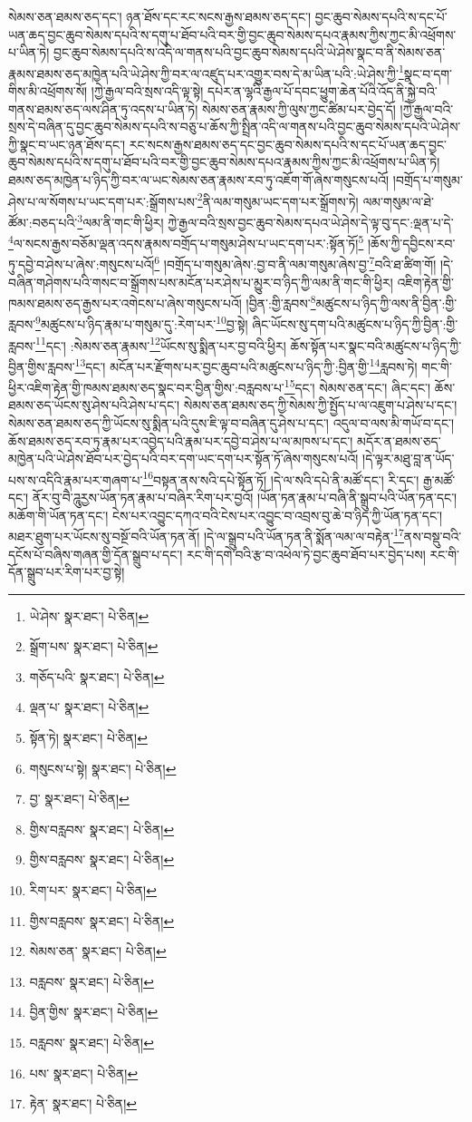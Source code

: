 སེམས་ཅན་ཐམས་ཅད་དང་། ཉན་ཐོས་དང་རང་སངས་རྒྱས་ཐམས་ཅད་དང་། བྱང་ཆུབ་སེམས་དཔའི་ས་དང་པོ་ཡན་ཆད་བྱང་ཆུབ་སེམས་དཔའི་ས་དགུ་པ་ཐོབ་པའི་བར་གྱི་བྱང་ཆུབ་སེམས་དཔའ་རྣམས་ཀྱིས་ཀྱང་མི་འཕྲོགས་པ་ཡིན་ཏེ། བྱང་ཆུབ་སེམས་དཔའི་ས་འདི་ལ་གནས་པའི་བྱང་ཆུབ་སེམས་དཔའི་ཡེ་ཤེས་སྣང་བ་ནི་སེམས་ཅན་རྣམས་ཐམས་ཅད་མཁྱེན་པའི་ཡེ་ཤེས་ཀྱི་བར་ལ་འཛུད་པར་འགྱུར་བས་དེ་མ་ཡིན་པའི་:ཡེ་ཤེས་ཀྱི་\footnote{ཡེ་ཤེས་  སྣར་ཐང་།  པེ་ཅིན། }སྣང་བ་དག་གིས་མི་འཕྲོགས་སོ། །ཀྱེ་རྒྱལ་བའི་སྲས་འདི་ལྟ་སྟེ། དཔེར་ན་ལྷའི་རྒྱལ་པོ་དབང་ཕྱུག་ཆེན་པོའི་འོད་ནི་སྐྱེ་བའི་གནས་ཐམས་ཅད་ལས་ཤིན་ཏུ་འདས་པ་ཡིན་ཏེ། སེམས་ཅན་རྣམས་ཀྱི་ལུས་ཀྱང་ཚིམ་པར་བྱེད་དོ། །ཀྱེ་རྒྱལ་བའི་སྲས་དེ་བཞིན་དུ་བྱང་ཆུབ་སེམས་དཔའི་ས་བཅུ་པ་ཆོས་ཀྱི་སྤྲིན་འདི་ལ་གནས་པའི་བྱང་ཆུབ་སེམས་དཔའི་ཡེ་ཤེས་ཀྱི་སྣང་བ་ཡང་ཉན་ཐོས་དང་། རང་སངས་རྒྱས་ཐམས་ཅད་དང་བྱང་ཆུབ་སེམས་དཔའི་ས་དང་པོ་ཡན་ཆད་བྱང་ཆུབ་སེམས་དཔའི་ས་དགུ་པ་ཐོབ་པའི་བར་གྱི་བྱང་ཆུབ་སེམས་དཔའ་རྣམས་ཀྱིས་ཀྱང་མི་འཕྲོགས་པ་ཡིན་ཏེ། ཐམས་ཅད་མཁྱེན་པ་ཉིད་ཀྱི་བར་ལ་ཡང་སེམས་ཅན་རྣམས་རབ་ཏུ་འཇོག་གོ་ཞེས་གསུངས་པའོ། །བགྲོད་པ་གསུམ་ཤེས་པ་ལ་སོགས་པ་ཡང་དག་པར་:སྒྲོགས་པས་\footnote{སྒྲོག་པས་  སྣར་ཐང་།  པེ་ཅིན། }ནི་ལམ་གསུམ་ཡང་དག་པར་སྒྲོགས་ཏེ། ལམ་གསུམ་ལ་ཐེ་ཚོམ་:བཅད་པའི་\footnote{གཅོད་པའི་  སྣར་ཐང་།  པེ་ཅིན། }ལམ་ནི་གང་གི་ཕྱིར། ཀྱེ་རྒྱལ་བའི་སྲས་བྱང་ཆུབ་སེམས་དཔའ་ཡེ་ཤེས་དེ་ལྟ་བུ་དང་:ལྡན་པ་དེ་\footnote{ལྡན་པ་  སྣར་ཐང་།  པེ་ཅིན། }ལ་སངས་རྒྱས་བཅོམ་ལྡན་འདས་རྣམས་བགྲོད་པ་གསུམ་ཤེས་པ་ཡང་དག་པར་:སྟོན་ཏོ།\footnote{སྟོན་ཏེ།  སྣར་ཐང་།  པེ་ཅིན། } །ཆོས་ཀྱི་དབྱིངས་རབ་ཏུ་དབྱེ་བ་ཤེས་པ་ཞེས་:གསུངས་པའོ།\footnote{གསུངས་པ་སྟེ།  སྣར་ཐང་།  པེ་ཅིན། } །བགྲོད་པ་གསུམ་ཞེས་:བྱ་བ་ནི་ལམ་གསུམ་ཞེས་བྱ་\footnote{བྱ་  སྣར་ཐང་།  པེ་ཅིན། }བའི་ཐ་ཚིག་གོ། །དེ་བཞིན་གཤེགས་པའི་གསང་བ་སྒྲོགས་པས་མངོན་པར་ཤེས་པ་མྱུར་བ་ཉིད་ཀྱི་ལམ་ནི་གང་གི་ཕྱིར། འཇིག་རྟེན་གྱི་ཁམས་ཐམས་ཅད་རྒྱས་པར་འགེངས་པ་ཞེས་གསུངས་པའོ། །བྱིན་:གྱི་རླབས་\footnote{གྱིས་བརླབས་  སྣར་ཐང་།  པེ་ཅིན། }མཚུངས་པ་ཉིད་ཀྱི་ལས་ནི་བྱིན་:གྱི་རླབས་\footnote{གྱིས་བརླབས་  སྣར་ཐང་།  པེ་ཅིན། }མཚུངས་པ་ཉིད་རྣམ་པ་གསུམ་དུ་:རེག་པར་\footnote{རིག་པར་  སྣར་ཐང་།  པེ་ཅིན། }བྱ་སྟེ། ཞིང་ཡོངས་སུ་དག་པའི་མཚུངས་པ་ཉིད་ཀྱི་བྱིན་:གྱི་རླབས་\footnote{གྱིས་བརླབས་  སྣར་ཐང་།  པེ་ཅིན། }དང་། :སེམས་ཅན་རྣམས་\footnote{སེམས་ཅན་  སྣར་ཐང་།  པེ་ཅིན། }ཡོངས་སུ་སྨིན་པར་བྱ་བའི་ཕྱིར། ཆོས་སྟོན་པར་སྣང་བའི་མཚུངས་པ་ཉིད་ཀྱི་བྱིན་གྱིས་རླབས་\footnote{བརླབས་  སྣར་ཐང་།  པེ་ཅིན། }དང་། མངོན་པར་རྫོགས་པར་བྱང་ཆུབ་པའི་མཚུངས་པ་ཉིད་ཀྱི་:བྱིན་གྱི་\footnote{བྱིན་གྱིས་  སྣར་ཐང་།  པེ་ཅིན། }རླབས་ཏེ། གང་གི་ཕྱིར་འཇིག་རྟེན་གྱི་ཁམས་ཐམས་ཅད་སྣང་བར་བྱིན་གྱིས་:བརླབས་པ་\footnote{བརླབས་  སྣར་ཐང་།  པེ་ཅིན། }དང་། སེམས་ཅན་དང་། ཞིང་དང་། ཆོས་ཐམས་ཅད་ཡོངས་སུ་ཤེས་པའི་ཤེས་པ་དང་། སེམས་ཅན་ཐམས་ཅད་ཀྱི་སེམས་ཀྱི་སྤྱོད་པ་ལ་འཇུག་པ་ཤེས་པ་དང་། སེམས་ཅན་ཐམས་ཅད་ཀྱི་ཡོངས་སུ་སྨིན་པའི་དུས་ཇི་ལྟ་བ་བཞིན་དུ་ཤེས་པ་དང་། འདུལ་བ་ལས་མི་གཡོ་བ་དང་། ཆོས་ཐམས་ཅད་རབ་ཏུ་རྣམ་པར་འབྱེད་པའི་རྣམ་པར་དབྱེ་བ་ཤེས་པ་ལ་མཁས་པ་དང་། མདོར་ན་ཐམས་ཅད་མཁྱེན་པའི་ཡེ་ཤེས་ཐོབ་པར་བྱེད་པའི་བར་དག་ཡང་དག་པར་སྟོན་ཏོ་ཞེས་གསུངས་པའོ། །དེ་ལྟར་མཐུ་བླ་ན་ཡོད་པས་ས་འདིའི་རྣམ་པར་གཞག་པ་\footnote{པས་  སྣར་ཐང་།  པེ་ཅིན། }བསྟན་ནས་སའི་དཔེ་སྟོན་ཏོ། །དེ་ལ་སའི་དཔེ་ནི་མཚོ་དང་། རི་དང་། རྒྱ་མཚོ་དང་། ནོར་བུ་བཻ་ཌཱུརྱས་ཡོན་ཏན་རྣམ་པ་བཞིར་རིག་པར་བྱའོ། །ཡོན་ཏན་རྣམ་པ་བཞི་ནི་སྒྲུབ་པའི་ཡོན་ཏན་དང་། མཆོག་གི་ཡོན་ཏན་དང་། ངེས་པར་འབྱུང་དཀའ་བའི་ངེས་པར་འབྱུང་བ་འབྲས་བུ་ཆེ་བ་ཉིད་ཀྱི་ཡོན་ཏན་དང་། མཐར་ཐུག་པར་ཡོངས་སུ་བསྔོ་བའི་ཡོན་ཏན་ནོ། །དེ་ལ་སྒྲུབ་པའི་ཡོན་ཏན་ནི་སྨོན་ལམ་ལ་བརྟེན་\footnote{རྟེན་  སྣར་ཐང་།  པེ་ཅིན། }ནས་བསྡུ་བའི་དངོས་པོ་བཞིས་གཞན་གྱི་དོན་སྒྲུབ་པ་དང་། རང་གི་དགེ་བའི་རྩ་བ་འཕེལ་ཏེ་བྱང་ཆུབ་ཐོབ་པར་བྱེད་པས། རང་གི་དོན་སྒྲུབ་པར་རིག་པར་བྱ་སྟེ། 